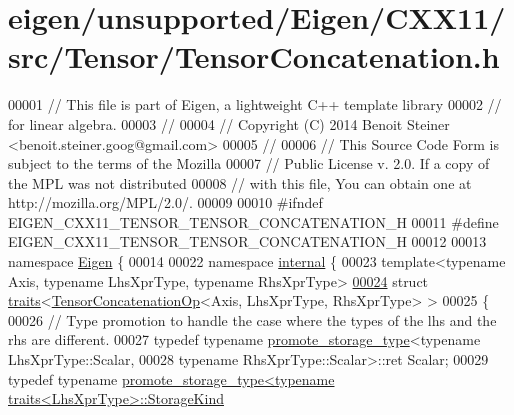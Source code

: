 \hypertarget{eigen_2unsupported_2_eigen_2_c_x_x11_2src_2_tensor_2_tensor_concatenation_8h_source}{}\section{eigen/unsupported/\+Eigen/\+C\+X\+X11/src/\+Tensor/\+Tensor\+Concatenation.h}
\label{eigen_2unsupported_2_eigen_2_c_x_x11_2src_2_tensor_2_tensor_concatenation_8h_source}

\begin{DoxyCode}
00001 \textcolor{comment}{// This file is part of Eigen, a lightweight C++ template library}
00002 \textcolor{comment}{// for linear algebra.}
00003 \textcolor{comment}{//}
00004 \textcolor{comment}{// Copyright (C) 2014 Benoit Steiner <benoit.steiner.goog@gmail.com>}
00005 \textcolor{comment}{//}
00006 \textcolor{comment}{// This Source Code Form is subject to the terms of the Mozilla}
00007 \textcolor{comment}{// Public License v. 2.0. If a copy of the MPL was not distributed}
00008 \textcolor{comment}{// with this file, You can obtain one at http://mozilla.org/MPL/2.0/.}
00009 
00010 \textcolor{preprocessor}{#ifndef EIGEN\_CXX11\_TENSOR\_TENSOR\_CONCATENATION\_H}
00011 \textcolor{preprocessor}{#define EIGEN\_CXX11\_TENSOR\_TENSOR\_CONCATENATION\_H}
00012 
00013 \textcolor{keyword}{namespace }\hyperlink{namespace_eigen}{Eigen} \{
00014 
00022 \textcolor{keyword}{namespace }\hyperlink{namespaceinternal}{internal} \{
00023 \textcolor{keyword}{template}<\textcolor{keyword}{typename} Axis, \textcolor{keyword}{typename} LhsXprType, \textcolor{keyword}{typename} RhsXprType>
\hyperlink{struct_eigen_1_1internal_1_1traits_3_01_tensor_concatenation_op_3_01_axis_00_01_lhs_xpr_type_00_01_rhs_xpr_type_01_4_01_4}{00024} \textcolor{keyword}{struct }\hyperlink{struct_eigen_1_1internal_1_1traits}{traits}<\hyperlink{class_eigen_1_1_tensor_concatenation_op}{TensorConcatenationOp}<Axis, LhsXprType, RhsXprType> >
00025 \{
00026   \textcolor{comment}{// Type promotion to handle the case where the types of the lhs and the rhs are different.}
00027   \textcolor{keyword}{typedef} \textcolor{keyword}{typename} \hyperlink{struct_eigen_1_1internal_1_1promote__storage__type}{promote\_storage\_type}<\textcolor{keyword}{typename} LhsXprType::Scalar,
00028                                         \textcolor{keyword}{typename} RhsXprType::Scalar>::ret Scalar;
00029   \textcolor{keyword}{typedef} \textcolor{keyword}{typename} \hyperlink{struct_eigen_1_1internal_1_1promote__storage__type}{promote\_storage\_type<typename traits<LhsXprType>::StorageKind}

\end{DoxyCode}
